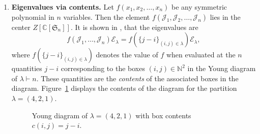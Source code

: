 \documentclass{article}
\theoremstyle{plain}
\theoremstyle{definition}
\numberwithin{equation}{section}
\begin{document}
\begin{enumerate}
    \item \textbf{Eigenvalues via contents.}
    Let $f(x_1,x_2,\dots,x_n)$ be any symmetric polynomial in $n$ variables. Then the element $f(\mathcal{J}_1,\mathcal{J}_2,\dots,\mathcal{J}_n)$ lies in the center $Z[\mathbb{C}[\mathfrak{S}_n]]$. It is shown in \cite{jucys1974symmetric, murphy1981new}, that the eigenvalues are
    \begin{equation}
        \label{eq:YJM elements on idemps}
        f\left(\mathcal{J}_1, \ldots, \mathcal{J}_n\right) \mathcal{E}_\lambda=f\left(\{j-i\}_{(i, j) \in \lambda}\right) \mathcal{E}_\lambda,
    \end{equation}
    where $f\left(\{j-i\}_{(i, j) \in \lambda}\right)$ denotes the value of $f$ when evaluated at the $n$ quantities $j-i$ corresponding to the boxes $(i,j)\in\mathbb{N}^2$ in the Young diagram of $\lambda\vdash n$. These quantities are the \emph{contents} of the associated boxes in the diagram. Figure~\ref{fig:young-contents} displays the contents of the diagram for the partition $\lambda = (4,2,1)$.
    \begin{figure}[htbp]
        \centering
        \caption{Young diagram of $\lambda=(4,2,1)$ with box contents $c(i,j)=j-i$.}
        \label{fig:young-contents}
    \end{figure}
    




\end{enumerate}
\end{document}
